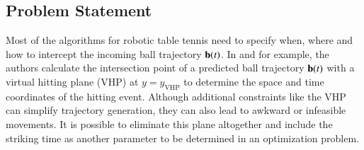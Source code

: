 \subsection{Problem Statement}\label{ps}

Most of the algorithms for robotic table tennis need to specify when, where and how to intercept the incoming ball trajectory $\boldsymbol{\mathrm{b}}(t)$. In \citet{Matsushima05} and \citet{Muelling11} for example, the authors calculate the intersection point of a predicted ball trajectory $\boldsymbol{\mathrm{b}}(t)$ with a virtual hitting plane (VHP) at $y = y_{\mathrm{VHP}}$ to determine the space and time coordinates of the hitting event. Although additional constraints like the VHP can simplify trajectory generation, they can also lead to awkward or infeasible movements. It is possible to eliminate this plane altogether and include the striking time as another parameter to be determined in an optimization problem.

